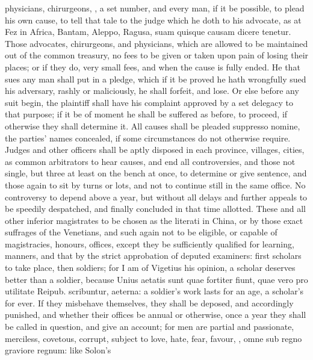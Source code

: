 {physicians, chirurgeons, \etc{}, a set number, and every man, if it
be possible, to plead his own cause, to tell that tale to the judge
which he doth to his advocate, as at Fez in Africa, Bantam, Aleppo,
Ragusa, suam quisque causam dicere tenetur. Those advocates,
chirurgeons, and physicians, which are allowed to be maintained
out of the common treasury, no fees to be given or taken upon pain
of losing their places; or if they do, very small fees, and when the
cause is fully ended. He that sues any man shall put in a
pledge, which if it be proved he hath wrongfully sued his adversary,
rashly or maliciously, he shall forfeit, and lose. Or else before any
suit begin, the plaintiff shall have his complaint approved by a set
delegacy to that purpose; if it be of moment he shall be suffered as
before, to proceed, if otherwise they shall determine it. All causes
shall be pleaded suppresso nomine, the parties' names concealed, if
some circumstances do not otherwise require. Judges and other officers
shall be aptly disposed in each province, villages, cities, as common
arbitrators to hear causes, and end all controversies, and those not
single, but three at least on the bench at once, to determine or give
sentence, and those again to sit by turns or lots, and not to continue
still in the same office. No controversy to depend above a year, but
without all delays and further appeals to be speedily despatched, and
finally concluded in that time allotted. These and all other inferior
magistrates to be chosen as the literati in China, or by those
exact suffrages of the Venetians, and such again not to be
eligible, or capable of magistracies, honours, offices, except they be
sufficiently qualified for learning, manners, and that by the
strict approbation of deputed examiners: first scholars to take
place, then soldiers; for I am of Vigetius his opinion, a scholar
deserves better than a soldier, because Unius aetatis sunt quae
fortiter fiunt, quae vero pro utilitate Reipub. scribuntur, aeterna: a
soldier's work lasts for an age, a scholar's for ever. If they
misbehave themselves, they shall be deposed, and accordingly
punished, and whether their offices be annual or otherwise, once a
year they shall be called in question, and give an account; for men are
partial and passionate, merciless, covetous, corrupt, subject to love,
hate, fear, favour, \etc{}, omne sub regno graviore regnum: like Solon's
}
